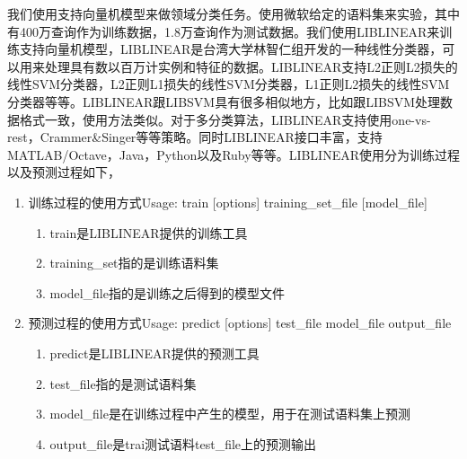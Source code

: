 \documentclass[master]{njuthesis}
\begin{document}
    我们使用支持向量机模型来做领域分类任务。使用微软给定的语料集来实验，其中有400万查询作为训练数据，1.8万查询作为测试数据。我们使用LIBLINEAR来训练支持向量机模型，LIBLINEAR是台湾大学林智仁组开发的一种线性分类器，可以用来处理具有数以百万计实例和特征的数据。LIBLINEAR支持L2正则L2损失的线性SVM分类器，L2正则L1损失的线性SVM分类器，L1正则L2损失的线性SVM分类器等等。LIBLINEAR跟LIBSVM具有很多相似地方，比如跟LIBSVM处理数据格式一致，使用方法类似。对于多分类算法，LIBLINEAR支持使用one-vs-rest，Crammer\&Singer等等策略。同时LIBLINEAR接口丰富，支持MATLAB/Octave，Java，Python以及Ruby等等。LIBLINEAR使用分为训练过程以及预测过程如下，
\begin{enumerate}
    \item 训练过程的使用方式Usage: train [options] training\_set\_file [model\_file]
     \begin{enumerate}
       \item train是LIBLINEAR提供的训练工具
       \item training\_set指的是训练语料集
       \item model\_file指的是训练之后得到的模型文件
     \end{enumerate}
    \item 预测过程的使用方式Usage: predict [options] test\_file model\_file output\_file
      \begin{enumerate}
        \item predict是LIBLINEAR提供的预测工具
	   \item test\_file指的是测试语料集
	   \item model\_file是在训练过程中产生的模型，用于在测试语料集上预测
	   \item output\_file是trai测试语料test\_file上的预测输出
      \end{enumerate}
\end{enumerate}
    
\end{document}
